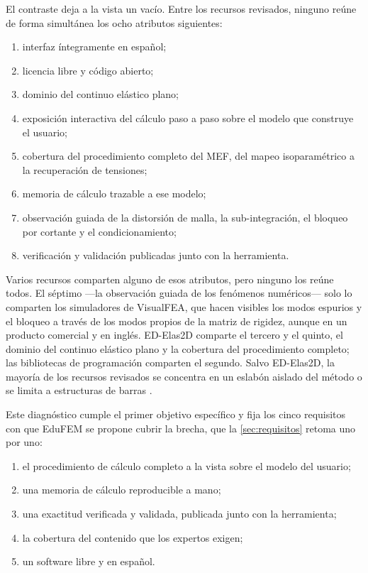El contraste deja a la vista un vacío. Entre los recursos revisados, ninguno reúne de forma simultánea los ocho atributos siguientes:

\begin{enumerate}
    \item interfaz íntegramente en español;
    \item licencia libre y código abierto;
    \item dominio del continuo elástico plano;
    \item exposición interactiva del cálculo paso a paso sobre el modelo que construye el usuario;
    \item cobertura del procedimiento completo del MEF, del mapeo isoparamétrico a la recuperación de tensiones;
    \item memoria de cálculo trazable a ese modelo;
    \item observación guiada de la distorsión de malla, la sub-integración, el bloqueo por cortante y el condicionamiento;
    \item verificación y validación publicadas junto con la herramienta.
\end{enumerate}

Varios recursos comparten alguno de esos atributos, pero ninguno los reúne todos. El séptimo —la observación guiada de los fenómenos numéricos— solo lo comparten los simuladores de VisualFEA, que hacen visibles los modos espurios y el bloqueo a través de los modos propios de la matriz de rigidez, aunque en un producto comercial y en inglés. ED-Elas2D comparte el tercero y el quinto, el dominio del continuo elástico plano y la cobertura del procedimiento completo; las bibliotecas de programación comparten el segundo. Salvo ED-Elas2D, la mayoría de los recursos revisados se concentra en un eslabón aislado del método o se limita a estructuras de barras \autocite[p.~17]{bishay2020teaching}.

Este diagnóstico cumple el primer objetivo específico y fija los cinco requisitos con que EduFEM se propone cubrir la brecha, que la \autoref{sec:requisitos} retoma uno por uno:

\begin{enumerate}
    \item el procedimiento de cálculo completo a la vista sobre el modelo del usuario;
    \item una memoria de cálculo reproducible a mano;
    \item una exactitud verificada y validada, publicada junto con la herramienta;
    \item la cobertura del contenido que los expertos exigen;
    \item un software libre y en español.
\end{enumerate}


